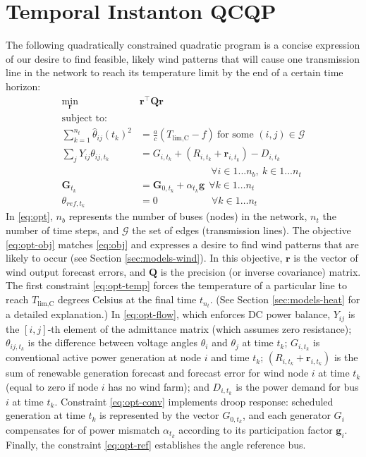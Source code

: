 \documentclass[journal,twoside]{IEEEtran}
\renewcommand{\vec}[1]{\mathbf{#1}}
\begin{document}
\section{Temporal Instanton QCQP}\label{sec:qcqp}
The following quadratically constrained quadratic program is a concise expression of our desire to find feasible, likely wind patterns that will cause one transmission line in the network to reach its temperature limit by the end of a certain time horizon:
\begin{subequations}\label{eq:opt}
\begin{align}
\label{eq:opt-obj}\underset{\vec{r}}{\min} \quad & \vec{r}^\top \mathbf{Q} \vec{r} \\
\nonumber \text{subject to:} & \\
\label{eq:opt-temp} \sum_{k=1}^{n_t} \hat{\theta}_{ij}(t_k)^2 &= \frac{a}{c}\left(T_\text{lim,C} - f\right)~ \text{for some }(i,j)\in \mathcal{G} \\
\label{eq:opt-flow} \sum_j Y_{ij} \theta_{ij,t_k} & = G_{i,t_k} + (R_{i,t_k} +
\vec{r}_{i,t_k}) - D_{i,t_k} \\[-6pt]
\nonumber &\qquad\qquad\qquad\quad~ \forall i \in 1... n_b,~k\in 1... n_t \\[6pt]
\label{eq:opt-conv} \vec{G}_{t_k} &= \vec{G}_{0,t_k} + \alpha_{t_k}\vec{g} ~~ \forall k\in 1\ldots n_t \\
\label{eq:opt-ref} \theta_{ref,t_k} & = 0 \quad\quad\quad\quad\quad~~ \forall k\in 1\ldots n_t
\end{align}
\end{subequations}
In \eqref{eq:opt}, $n_b$ represents the number of buses (nodes) in the network, $n_t$ the number of time steps, and $\mathcal{G}$ the set of edges (transmission lines). The objective \eqref{eq:opt-obj} matches \eqref{eq:obj} and expresses a desire to find wind patterns that are likely to occur (see Section \ref{sec:models-wind}). In this objective, $\vec{r}$ is the vector of wind output forecast errors, and $\mathbf{Q}$ is the precision (or inverse covariance) matrix. The first constraint \eqref{eq:opt-temp} forces the temperature of a particular line to reach $T_\text{lim,C}$ degrees Celsius at the final time $t_{n_t}$. (See Section \ref{sec:models-heat} for a detailed explanation.) In \eqref{eq:opt-flow}, which enforces DC power balance, $Y_{ij}$ is the $[i,j]$-th element of the admittance matrix (which assumes zero resistance); $\theta_{ij,t_k}$ is the difference between voltage angles $\theta_i$ and $\theta_j$ at time $t_k$; $G_{i,t_k}$ is conventional active power generation at node $i$ and time $t_k$; $(R_{i,t_k} + \vec{r}_{i,t_k})$ is the sum of renewable generation forecast and forecast error for wind node $i$ at time $t_k$ (equal to zero if node $i$ has no wind farm); and $D_{i,t_k}$ is the power demand for bus $i$ at time $t_k$. Constraint \eqref{eq:opt-conv} implements droop response: scheduled generation at time $t_k$ is represented by the vector $G_{0,t_k}$, and each generator $G_i$ compensates for of power mismatch $\alpha_{t_k}$ according to its participation factor $\vec{g}_i$. Finally, the constraint \eqref{eq:opt-ref} establishes the angle reference bus.
\end{document}
